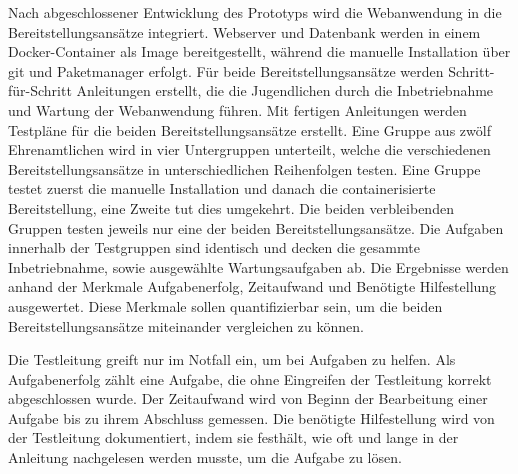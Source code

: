 \documentclass[
    12pt,
    ngerman,
    a4paper,
    oneside
]{book}
\begin{document}
Nach abgeschlossener Entwicklung des Prototyps wird die Webanwendung in die Bereitstellungsansätze integriert.
Webserver und Datenbank werden in einem Docker-Container als Image bereitgestellt, während die manuelle Installation über git und Paketmanager erfolgt.
Für beide Bereitstellungsansätze werden Schritt-für-Schritt Anleitungen erstellt, die die Jugendlichen durch die Inbetriebnahme und Wartung der Webanwendung führen.
Mit fertigen Anleitungen werden Testpläne für die beiden Bereitstellungsansätze erstellt.
Eine Gruppe aus zwölf Ehrenamtlichen wird in vier Untergruppen unterteilt, welche die verschiedenen Bereitstellungsansätze in unterschiedlichen Reihenfolgen testen.
Eine Gruppe testet zuerst die manuelle Installation und danach die containerisierte Bereitstellung, eine Zweite tut dies umgekehrt.
Die beiden verbleibenden Gruppen testen jeweils nur eine der beiden Bereitstellungsansätze.
Die Aufgaben innerhalb der Testgruppen sind identisch und decken die gesammte Inbetriebnahme, sowie ausgewählte Wartungsaufgaben ab.
Die Ergebnisse werden anhand der Merkmale Aufgabenerfolg, Zeitaufwand und Benötigte Hilfestellung ausgewertet.
Diese Merkmale sollen quantifizierbar sein, um die beiden Bereitstellungsansätze miteinander vergleichen zu können.

Die Testleitung greift nur im Notfall ein, um bei Aufgaben zu helfen.
Als Aufgabenerfolg zählt eine Aufgabe, die ohne Eingreifen der Testleitung korrekt abgeschlossen wurde.
Der Zeitaufwand wird von Beginn der Bearbeitung einer Aufgabe bis zu ihrem Abschluss gemessen.
Die benötigte Hilfestellung wird von der Testleitung dokumentiert, indem sie festhält, wie oft und lange in der Anleitung nachgelesen werden musste, um die Aufgabe zu lösen.
\end{document}
